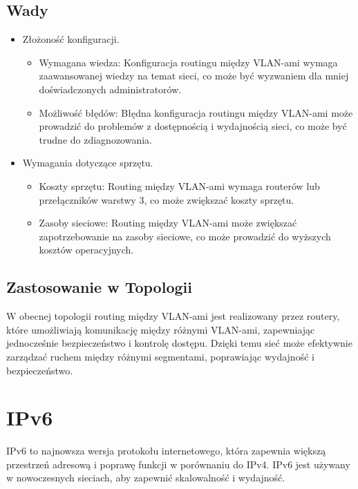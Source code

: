 \subsection{Wady}
\begin{itemize}
    \item Złożoność konfiguracji.
    \begin{itemize}
        \item Wymagana wiedza: Konfiguracja routingu między VLAN-ami wymaga zaawansowanej wiedzy na temat sieci, co może być wyzwaniem dla mniej doświadczonych administratorów.
        \item Możliwość błędów: Błędna konfiguracja routingu między VLAN-ami może prowadzić do problemów z dostępnością i wydajnością sieci, co może być trudne do zdiagnozowania.
    \end{itemize}
    \item Wymagania dotyczące sprzętu.
    \begin{itemize}
        \item Koszty sprzętu: Routing między VLAN-ami wymaga routerów lub przełączników warstwy 3, co może zwiększać koszty sprzętu.
        \item Zasoby sieciowe: Routing między VLAN-ami może zwiększać zapotrzebowanie na zasoby sieciowe, co może prowadzić do wyższych kosztów operacyjnych.
    \end{itemize}
\end{itemize}

\subsection{Zastosowanie w Topologii}
W obecnej topologii routing między VLAN-ami jest realizowany przez routery, które umożliwiają komunikację między różnymi VLAN-ami, zapewniając jednocześnie bezpieczeństwo i kontrolę dostępu. Dzięki temu sieć może efektywnie zarządzać ruchem między różnymi segmentami, poprawiając wydajność i bezpieczeństwo.

\section{IPv6}

IPv6 to najnowsza wersja protokołu internetowego, która zapewnia większą przestrzeń adresową i poprawę funkcji w porównaniu do IPv4. IPv6 jest używany w nowoczesnych sieciach, aby zapewnić skalowalność i wydajność.

